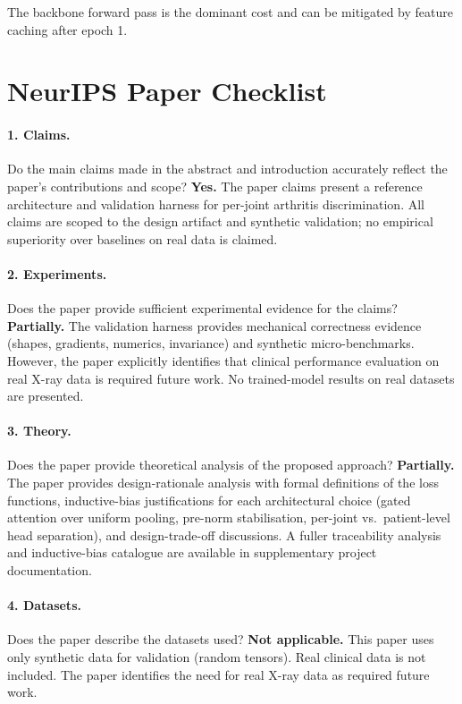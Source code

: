 \documentclass{article}
\begin{document}
The backbone forward pass is the dominant cost and can be mitigated by feature caching after epoch 1.

\newpage
\section*{NeurIPS Paper Checklist}

\paragraph{1. Claims.}
Do the main claims made in the abstract and introduction accurately reflect the paper's contributions and scope?
\textbf{Yes.} The paper claims present a reference architecture and validation harness for per-joint arthritis discrimination. All claims are scoped to the design artifact and synthetic validation; no empirical superiority over baselines on real data is claimed.

\paragraph{2. Experiments.}
Does the paper provide sufficient experimental evidence for the claims?
\textbf{Partially.} The validation harness provides mechanical correctness evidence (shapes, gradients, numerics, invariance) and synthetic micro-benchmarks. However, the paper explicitly identifies that clinical performance evaluation on real X-ray data is required future work. No trained-model results on real datasets are presented.

\paragraph{3. Theory.}
Does the paper provide theoretical analysis of the proposed approach?
\textbf{Partially.} The paper provides design-rationale analysis with formal definitions of the loss functions, inductive-bias justifications for each architectural choice (gated attention over uniform pooling, pre-norm stabilisation, per-joint vs.\ patient-level head separation), and design-trade-off discussions. A fuller traceability analysis and inductive-bias catalogue are available in supplementary project documentation.

\paragraph{4. Datasets.}
Does the paper describe the datasets used?
\textbf{Not applicable.} This paper uses only synthetic data for validation (random tensors). Real clinical data is not included. The paper identifies the need for real X-ray data as required future work.
\end{document}
